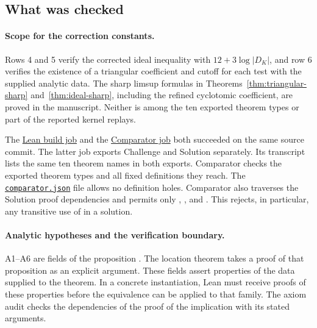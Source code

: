 \documentclass[11pt]{amsart}
\theoremstyle{definition}
\theoremstyle{remark}
\numberwithin{equation}{section}
\newcommand{\repositoryurl}{https://github.com/kimihiro64/Robin1984}
\newcommand{\proofrevision}{b359826e62c50b6cef55db4b2fcab793232498cc}
\newcommand{\codefile}[1]{%
  \href{\repositoryurl/blob/\proofrevision/#1}{\nolinkurl{#1}}}
\begin{document}
\subsection{What was checked}\label{sec:formalization}

\paragraph{Scope for the correction constants.}
Rows 4 and 5 verify the corrected ideal inequality with
\(12+3\log|D_K|\), and row 6 verifies the existence of a
triangular coefficient and cutoff for each test with the
supplied analytic data. The sharp limsup formulas in
Theorems~\ref{thm:triangular-sharp} and~\ref{thm:ideal-sharp},
including the refined cyclotomic coefficient, are proved in
the manuscript. Neither is among the ten exported theorem
types or part of the reported kernel replays.

The \href{\repositoryurl/actions/runs/45793028032/job/139816678988}
{Lean build job} and the
\href{\repositoryurl/actions/runs/45793028032/job/139868568337}
{Comparator job} both succeeded on the same source commit.
The latter job exports Challenge and Solution separately.
Its transcript lists the same ten theorem names in both exports.
Comparator checks the exported theorem types and all fixed
definitions they reach. The \codefile{comparator.json} file
allows no definition holes. Comparator also traverses the
Solution proof dependencies and permits only ,
, and . This rejects,
in particular, any transitive use of  in a solution.

\paragraph{Analytic hypotheses and the verification boundary.}
A1--A6 are fields of the proposition
. The location
theorem takes a proof of that proposition as an explicit
argument. These fields assert properties of the data supplied
to the theorem. In a concrete instantiation, Lean must receive
proofs of these properties before the equivalence can be applied
to that family. The axiom audit checks the dependencies of the
proof of the implication with its stated arguments.
\end{document}

